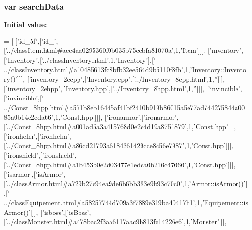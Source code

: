 \subsubsection[{search\-Data}]{\setlength{\rightskip}{0pt plus 5cm}var search\-Data}\label{all__9_8js_ad01a7523f103d6242ef9b0451861231e}
{\bfseries Initial value\-:}
\begin{DoxyCode}
=
[
  [\textcolor{stringliteral}{'id\_5f'},[\textcolor{stringliteral}{'id\_'},[\textcolor{stringliteral}{'../classItem.html#acc4aa0295360f0b035b75cebfa81070a'},1,\textcolor{stringliteral}{'Item'}]]],
  [\textcolor{stringliteral}{'inventory'},[\textcolor{stringliteral}{'Inventory'},[\textcolor{stringliteral}{'../classInventory.html'},1,\textcolor{stringliteral}{'Inventory'}],[\textcolor{stringliteral}{'
      ../classInventory.html#a10485613fc8bfb32ee564d9b5110f8fb'},1,\textcolor{stringliteral}{'Inventory::Inventory()'}]]],
  [\textcolor{stringliteral}{'inventory\_2ecpp'},[\textcolor{stringliteral}{'Inventory.cpp'},[\textcolor{stringliteral}{'../Inventory\_8cpp.html'},1,\textcolor{stringliteral}{''}]]],
  [\textcolor{stringliteral}{'inventory\_2ehpp'},[\textcolor{stringliteral}{'Inventory.hpp'},[\textcolor{stringliteral}{'../Inventory\_8hpp.html'},1,\textcolor{stringliteral}{''}]]],
  [\textcolor{stringliteral}{'invincible'},[\textcolor{stringliteral}{'invincible'},[\textcolor{stringliteral}{'
      ../Const\_8hpp.html#a571b8eb16445af41bf2410b919b86015a5e77ad744275844a0085a0b14c2cda66'},1,\textcolor{stringliteral}{'Const.hpp'}]]],
  [\textcolor{stringliteral}{'ironarmor'},[\textcolor{stringliteral}{'ironarmor'},[\textcolor{stringliteral}{'../Const\_8hpp.html#a001ad5a3a415768d0e2c4d19a8751879'},1,\textcolor{stringliteral}{'Const.hpp'}]]],
  [\textcolor{stringliteral}{'ironhelm'},[\textcolor{stringliteral}{'ironhelm'},[\textcolor{stringliteral}{'../Const\_8hpp.html#a86cd21793a6184361429cce8c56e7987'},1,\textcolor{stringliteral}{'Const.hpp'}]]],
  [\textcolor{stringliteral}{'ironshield'},[\textcolor{stringliteral}{'ironshield'},[\textcolor{stringliteral}{'../Const\_8hpp.html#a1b453b0e2d03477e1edca6b216c47666'},1,\textcolor{stringliteral}{'Const.hpp'}]]],
  [\textcolor{stringliteral}{'isarmor'},[\textcolor{stringliteral}{'isArmor'},[\textcolor{stringliteral}{'../classArmor.html#a729b27c94ea9de6b6bb383e9b93c70c0'},1,\textcolor{stringliteral}{'Armor::isArmor()'}],[\textcolor{stringliteral}{'
      ../classEquipement.html#a58257744d709a3f7889e319ba40417b1'},1,\textcolor{stringliteral}{'Equipement::isArmor()'}]]],
  [\textcolor{stringliteral}{'isboss'},[\textcolor{stringliteral}{'isBoss'},[\textcolor{stringliteral}{'../classMonster.html#a478bac2f3aa6117aac9b813fc14226e6'},1,\textcolor{stringliteral}{'Monster'}]]],

\end{DoxyCode}
